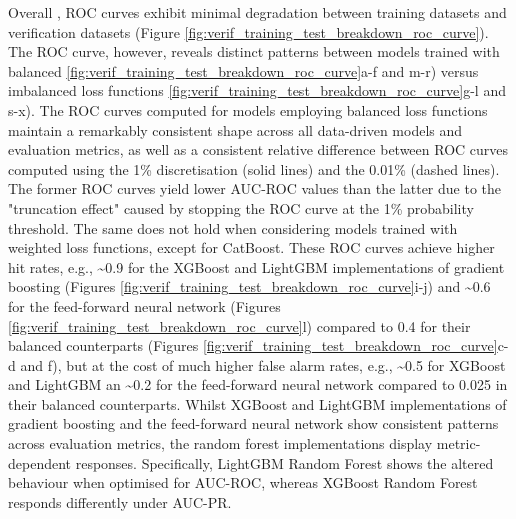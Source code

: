Overall ,
ROC curves exhibit minimal degradation between \textcolor{colourTraining}{training datasets} and \textcolor{colourTest}{verification datasets} (Figure \ref{fig:verif_training_test_breakdown_roc_curve}). The ROC curve, however, reveals distinct patterns between models trained with balanced \ref{fig:verif_training_test_breakdown_roc_curve}a-f and m-r) versus imbalanced loss functions \ref{fig:verif_training_test_breakdown_roc_curve}g-l and s-x). The ROC curves computed for models employing balanced loss functions maintain a remarkably consistent shape across all data-driven models and evaluation metrics, as well as a consistent relative difference between ROC curves computed using the 1\% discretisation (solid lines) and the 0.01\% (dashed lines). The former ROC curves yield lower AUC-ROC values than the latter due to the "truncation effect" caused by stopping the ROC curve at the 1\% probability threshold. The same does not hold when considering models trained with weighted loss functions, except for CatBoost. These ROC curves achieve higher hit rates, e.g., \sim0.9 for the XGBoost and LightGBM implementations of gradient boosting (Figures \ref{fig:verif_training_test_breakdown_roc_curve}i-j) and \sim0.6 for the feed-forward neural network (Figures \ref{fig:verif_training_test_breakdown_roc_curve}l) compared to 0.4 for their balanced counterparts (Figures \ref{fig:verif_training_test_breakdown_roc_curve}c-d and f), but at the cost of much higher false alarm rates, e.g., \sim0.5 for XGBoost and LightGBM an \sim0.2 for the feed-forward neural network compared to 0.025 in their balanced counterparts. Whilst XGBoost and LightGBM implementations of gradient boosting and the feed-forward neural network show consistent patterns across evaluation metrics, the random forest implementations display metric-dependent responses. Specifically, LightGBM Random Forest shows the altered behaviour when optimised for AUC-ROC, whereas XGBoost Random Forest responds differently under AUC-PR.

